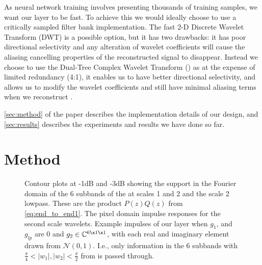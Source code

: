 As neural network training involves presenting thousands of training samples, we want our layer to
be fast. To achieve this we would ideally choose to use a critically sampled filter bank
implementation. The fast 2-D Discrete Wavelet Transform (DWT) is a possible option, but it has two
drawbacks: it has poor directional selectivity and any alteration of wavelet coefficients will cause
the aliasing cancelling properties of the reconstructed signal to disappear.  Instead we choose to
use the Dual-Tree Complex Wavelet Transform (\DTCWT) \cite{selesnick_dual-tree_2005} as at the
expense of limited redundancy (4:1), it enables us to have better directional selectivity, and allows
us to modify the wavelet coefficients and still have minimal aliasing terms when we reconstruct
\cite{kingsbury_complex_2001}.

\autoref{sec:method} of the paper describes the implementation details of our design, and
\autoref{sec:results} describes the experiments and results we have done so far.

\section{Method}\label{sec:method}
\begin{figure}
  \centering
  \subfloat[]{%
    \label{fig:dtcwt_bands_freq}
  }
  \hspace{1cm}
  \subfloat[]{%
    \label{fig:dtcwt_bands_impulse}
  }
  \newline
  \subfloat[]{%
    \label{fig:example_impulses}
  }
  \caption[Contour Plots]{ Contour plots at -1dB and -3dB showing the support in the
    Fourier domain of the 6 subbands of the \DTCWT at scales 1 and 2 and the scale 2 lowpass. These
    are the product $P(z)Q(z)$ from \autoref{eq:end_to_end1}.%
     The pixel domain impulse responses for the second scale
    wavelets.  Example impulses of our layer when $g_1$, and $g_{lp}$ are 0 
    and $g_2 \in \mathbb{C}^{6\x 1\x 1}$, with each real and imaginary element drawn 
    from $\mathcal{N}(0,1)$. I.e., only information in the 6 subbands with $\frac{\pi}{4} < |w_1|,
    |w_2| < \frac{\pi}{2}$ from  is passed through.} 
  \label{fig:dtcwt_bands}
\end{figure}

